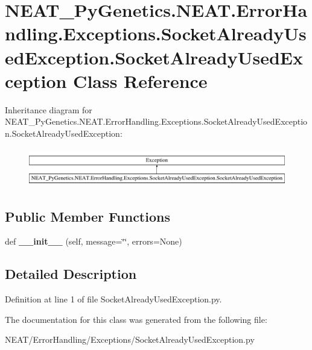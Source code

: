 \hypertarget{class_n_e_a_t___py_genetics_1_1_n_e_a_t_1_1_error_handling_1_1_exceptions_1_1_socket_already_usec2845100a8624939d4f1ab320dc8a73f}{}\section{N\+E\+A\+T\+\_\+\+Py\+Genetics.\+N\+E\+A\+T.\+Error\+Handling.\+Exceptions.\+Socket\+Already\+Used\+Exception.\+Socket\+Already\+Used\+Exception Class Reference}
\label{class_n_e_a_t___py_genetics_1_1_n_e_a_t_1_1_error_handling_1_1_exceptions_1_1_socket_already_usec2845100a8624939d4f1ab320dc8a73f}
Inheritance diagram for N\+E\+A\+T\+\_\+\+Py\+Genetics.\+N\+E\+A\+T.\+Error\+Handling.\+Exceptions.\+Socket\+Already\+Used\+Exception.\+Socket\+Already\+Used\+Exception\+:\begin{figure}[H]
\begin{center}
\leavevmode
\includegraphics[height=1.723077cm]{class_n_e_a_t___py_genetics_1_1_n_e_a_t_1_1_error_handling_1_1_exceptions_1_1_socket_already_usec2845100a8624939d4f1ab320dc8a73f}
\end{center}
\end{figure}
\subsection*{Public Member Functions}
\begin{DoxyCompactItemize}
\item 
def {\bfseries \+\_\+\+\_\+init\+\_\+\+\_\+} (self, message=\char`\"{}\char`\"{}, errors=None)\hypertarget{class_n_e_a_t___py_genetics_1_1_n_e_a_t_1_1_error_handling_1_1_exceptions_1_1_socket_already_usec2845100a8624939d4f1ab320dc8a73f_aa78052a441ad0d25947f06f3ed625c1c}{}\label{class_n_e_a_t___py_genetics_1_1_n_e_a_t_1_1_error_handling_1_1_exceptions_1_1_socket_already_usec2845100a8624939d4f1ab320dc8a73f_aa78052a441ad0d25947f06f3ed625c1c}

\end{DoxyCompactItemize}


\subsection{Detailed Description}


Definition at line 1 of file Socket\+Already\+Used\+Exception.\+py.



The documentation for this class was generated from the following file\+:\begin{DoxyCompactItemize}
\item 
N\+E\+A\+T/\+Error\+Handling/\+Exceptions/Socket\+Already\+Used\+Exception.\+py\end{DoxyCompactItemize}
